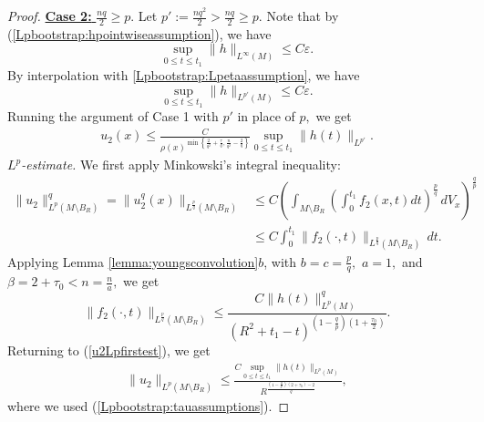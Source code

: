 \documentclass[12pt]{amsart}
\renewcommand{\1}{{\mathbf 1}}
\newcommand{\eps}{{\varepsilon}}
\theoremstyle{others}
\numberwithin{equation}{section}
\begin{document}
\begin{proof}
     \noindent \underline{{\bf Case 2:} $\frac{nq}{2} \geq p.$} Let $p' := \frac{nq^2}{2} > \frac{nq}{2} \geq p.$ Note that by (\ref{Lpbootstrap:hpointwiseassumption}), we have
     $$\sup_{0 \leq t \leq t_1} \|h\|_{L^\infty(M) } \leq C \eps.$$
     By interpolation with {\eqref{Lpbootstrap:Lpetaassumption}}, we have
     $$\sup_{0 \leq t \leq t_1} \|h\|_{L^{p'}(M) } \leq C \eps.$$
     Running the argument of Case 1 with $p'$ in place of $p,$ we get
      \begin{equation}\label{u2xcase2est}
     \begin{split}
         u_2(x) \leq \frac{C}{\rho(x)^{\min \left\{ \frac{2}{q^2} + \frac{\tau}{q}, \frac{n}{q^2} - \frac{2}{q} \right\} } } \sup_{0 \leq t \leq t_1} \|h(t) \|_{L^{p'}}.
         \end{split}
     \end{equation}  
\noindent \emph{$L^p$-estimate.} We first apply Minkowski's integral inequality:
     \begin{equation}\label{u2Lpfirstest}
     \begin{split}
        \| u_2\|^q_{L^{p}(M \setminus B_R)} = \| u_2^q(x) \|_{L^{\frac{p}{q}}(M \setminus B_R)} & \leq C \left( \int_{M \setminus B_R} \left( \int_0^{t_1} f_2(x,t) dt \right)^{\frac{p}{q}} \, dV_x \right)^{\frac{q}{p}} \\
        & \leq C \int_0^{t_1} \|f_2(\cdot, t) \|_{L^{\frac{p}{q}}(M \setminus B_R)} \, dt.
        \end{split}
    \end{equation}
    Applying Lemma \ref{lemma:youngsconvolution}$b$, with $b = c = \frac{p}{q},$ $a = 1,$ and $\beta = 2 + \tau_0 < n = \frac{n}{a},$ 
    we get
    $$\|f_2(\cdot, t) \|_{L^{\frac{p}{q}}(M \setminus B_R)} \leq \frac{C \|h(t) \|_{L^p(M)}^q }{ \left( R^2 + t_1 -t \right)^{ \left( 1 - \frac{q}{p} \right)\left(1 + \frac{\tau_0}{2} \right)} } .$$
    Returning to (\ref{u2Lpfirstest}), we get
   \begin{equation}\label{u2Lpest}
       \begin{split}
           \| u_2 \|_{L^{p}(M \setminus B_R)} \leq \frac{C \sup_{0 \leq t \leq t_1} \|h(t) \|_{L^p(M)} }{ R^{ \frac{ \left( 1 - \frac{q}{p} \right)\left(2 + \tau_0 \right) - 2 }{q} } },
       \end{split}
   \end{equation}
   where we used (\ref{Lpbootstrap:tauassumptions}). %

   
       \vspace{2mm}
       

\end{proof}
\end{document}
